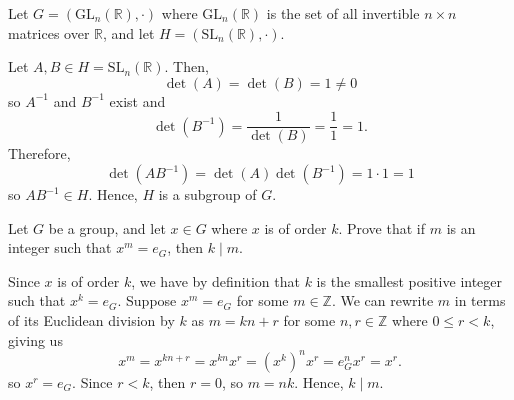 \begin{exer}
Let $ G=(\mathrm{GL}_n(\mathbb{R}),\cdot) $ where $ \mathrm{GL}_n(\mathbb{R}) $ is the set of all invertible $ n\times n $ matrices over $ \mathbb{R} $, and let $ H=(\mathrm{SL}_n(\mathbb{R}),\cdot) $.
\end{exer}
\begin{sltn}
Let $ A,B\in H=\mathrm{SL}_n(\mathbb{R}) $. Then,
\begin{equation*}
    \det(A)=\det(B)=1\neq0
\end{equation*}
so $ A^{-1} $ and $ B^{-1} $ exist and
\begin{equation*}
    \det(B^{-1})=\frac{1}{\det(B)}=\frac{1}{1}=1.
\end{equation*}
Therefore,
\begin{equation*}
    \det(AB^{-1})=\det(A)\det(B^{-1})=1\cdot 1=1
\end{equation*}
so $ AB^{-1}\in H $. Hence, $ H $ is a subgroup of $ G $.
\end{sltn}

\begin{exer}
Let $ G $ be a group, and let $ x\in G $ where $ x $ is of order $ k $. Prove that if $ m $ is an integer such that $ x^m=e_G $, then $ k\mid m $.
\end{exer}
\begin{sltn}
Since $ x $ is of order $ k $, we have by definition that $ k $ is the smallest positive integer such that $ x^k=e_G $. Suppose $ x^m=e_G $ for some $ m\in\mathbb{Z} $. We can rewrite $ m $ in terms of its Euclidean division by $ k $ as $ m=kn+r $ for some $ n,r\in\mathbb{Z} $ where $ 0\leq r<k $, giving us
\begin{equation*}
    x^m=x^{kn+r}=x^{kn}x^r=(x^k)^n x^r=e_G^n x^r=x^r.
\end{equation*}
so $ x^r=e_G $. Since $ r<k $, then $ r=0 $, so $ m=nk $. Hence, $ k\mid m $.
\end{sltn}